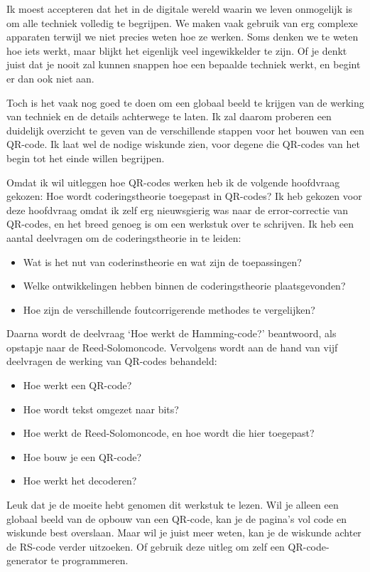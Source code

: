 \documentclass[a4paper]{article}
\begin{document}
Ik moest accepteren dat het in de digitale wereld waarin we leven onmogelijk is om alle techniek volledig te begrijpen. We maken vaak gebruik van erg complexe apparaten terwijl we niet precies weten hoe ze werken. Soms denken we te weten hoe iets werkt, maar blijkt het eigenlijk veel ingewikkelder te zijn. Of je denkt juist dat je nooit zal kunnen snappen hoe een bepaalde techniek werkt, en begint er dan ook niet aan.

Toch is het vaak nog goed te doen om een globaal beeld te krijgen van de werking van techniek en de details achterwege te laten. Ik zal daarom proberen een duidelijk overzicht te geven van de verschillende stappen voor het bouwen van een QR-code. Ik laat wel de nodige wiskunde zien, voor degene die QR-codes van het begin tot het einde willen begrijpen.

Omdat ik wil uitleggen hoe QR-codes werken heb ik de volgende hoofdvraag gekozen: Hoe wordt coderingstheorie toegepast in QR-codes? Ik heb gekozen voor deze hoofdvraag omdat ik zelf erg nieuwsgierig was naar de error-correctie van QR-codes, en het breed genoeg is om een werkstuk over te schrijven. Ik heb een aantal deelvragen om de coderingstheorie in te leiden:
\begin{itemize}
\item Wat is het nut van coderinstheorie en wat zijn de toepassingen?
\item Welke ontwikkelingen hebben binnen de coderingstheorie plaatsgevonden?
\item Hoe zijn de verschillende foutcorrigerende methodes te vergelijken?
\end{itemize}

Daarna wordt de deelvraag `Hoe werkt de Hamming-code?' beantwoord, als opstapje naar de Reed-Solomoncode. Vervolgens wordt aan de hand van vijf deelvragen de werking van QR-codes behandeld:
\begin{itemize}
\item Hoe werkt een QR-code?
\item Hoe wordt tekst omgezet naar bits?
\item Hoe werkt de Reed-Solomoncode, en hoe wordt die hier toegepast?
\item Hoe bouw je een QR-code?
\item Hoe werkt het decoderen?
\end{itemize}

Leuk dat je de moeite hebt genomen dit werkstuk te lezen. Wil je alleen een globaal beeld van de opbouw van een QR-code, kan je de pagina's vol code en wiskunde best overslaan. Maar wil je juist meer weten, kan je de wiskunde achter de RS-code verder uitzoeken. Of gebruik deze uitleg om zelf een QR-code-generator te programmeren.
\end{document}
